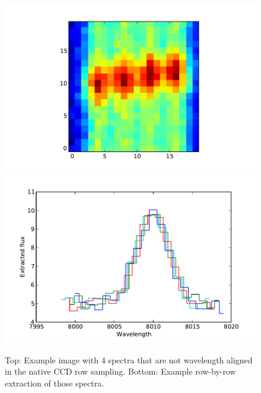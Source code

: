 \documentclass[12pt]{article}
\begin{document}
\begin{figure}[t]
\centering
\includegraphics[height=0.4\textheight]{plots/multispec_img.pdf}
\includegraphics[height=0.4\textheight]{plots/multispec_extract.pdf}
\caption{
Top: Example image with 4 spectra that are not wavelength aligned in the
native CCD row sampling.
Bottom: Example row-by-row extraction of those spectra.
}
\label{fig:multispec_img}
\end{figure}
\end{document}
